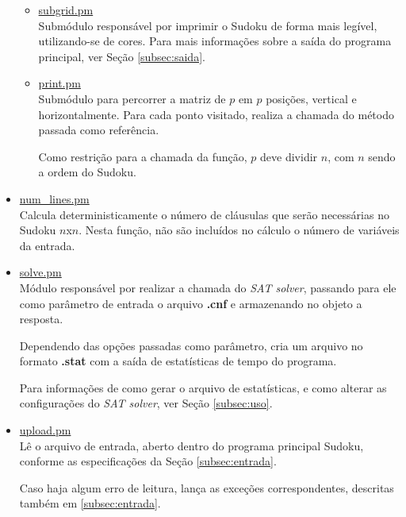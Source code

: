 \documentclass[a4paper]{article}
\begin{document}
\begin{itemize}
\begin{itemize}
          \item \href{run:../lib/Sudoku/grid/print.pm}{subgrid.pm} \\
          
            Submódulo responsável por imprimir o Sudoku de forma mais
            legível, utilizando-se de cores. Para mais informações 
            sobre a saída do programa principal, ver Seção 
            \ref{subsec:saida}. \\
            
          \item \href{run:../lib/Sudoku/grid/print.pm}{print.pm} \\
            
            Submódulo para percorrer a matriz de $p$ em $p$ posições,
            vertical e horizontalmente. Para cada ponto visitado, 
            realiza a chamada do método passada como referência.
            
            Como restrição para a chamada da função, $p$ deve dividir
            $n$, com $n$ sendo a ordem do Sudoku.
            
        \end{itemize}
        
      \item \href{run:../lib/Sudoku/num\_lines.pm}{num\_lines.pm} \\
        Calcula deterministicamente o número de cláusulas que serão
        necessárias no Sudoku $n$x$n$. Nesta função, não são incluídos
        no cálculo o número de variáveis da entrada.
        
      \item \href{run:../lib/Sudoku/solve.pm}{solve.pm} \\
        Módulo responsável por realizar a chamada do \emph{SAT solver},
        passando para ele como parâmetro de entrada o arquivo \textbf{.cnf}
        e armazenando no objeto a resposta.
        
        Dependendo das opções passadas como parâmetro, cria um arquivo 
        no formato \textbf{.stat} com a saída de estatísticas de tempo
        do programa. 
        
        Para informações de como gerar o arquivo de estatísticas, e 
        como alterar as configurações do \emph{SAT solver}, ver Seção
        \ref{subsec:uso}.
        
      \item \href{run:../lib/Sudoku/upload.pm}{upload.pm} \\
        Lê o arquivo de entrada, aberto dentro do programa principal
        Sudoku, conforme as especificações da Seção \ref{subsec:entrada}.
        
        Caso haja algum erro de leitura, lança as exceções correspondentes,
        descritas também em \ref{subsec:entrada}.
            
    \end{itemize}
    
\end{document}
